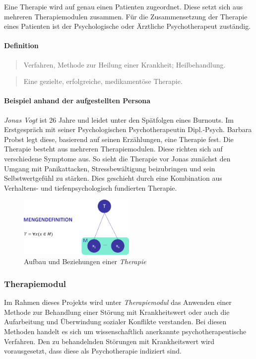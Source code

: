 Eine Therapie wird auf genau  einen Patienten zugeordnet. Diese setzt sich aus mehreren Therapiemodulen zusammen. Für die Zusammensetzung der Therapie eines Patienten ist der Psychologische oder Ärztliche Psychotherapeut zuständig.

\paragraph{Definition}
\begin{quote}
Verfahren, Methode zur Heilung einer Krankheit; Heilbehandlung. \cite{PsychThG4:online}
\end{quote}

\begin{quote}
	Eine gezielte, erfolgreiche, medikamentöse Therapie. \cite{44:online}
\end{quote}

\paragraph{Beispiel anhand der aufgestellten Persona}
\emph{Jonas Vogt} ist 26 Jahre und leidet unter den Spätfolgen eines Burnouts. Im Erstgespräch mit seiner Psychologischen Psychotherapeutin Dipl.-Psych. Barbara Probst legt diese, basierend auf seinen Erzählungen, eine Therapie fest. Die Therapie besteht aus  mehreren Therapiemodulen. Diese richten sich auf verschiedene Symptome aus. So sieht die Therapie vor Jonas zunächst den Umgang mit Panikattacken, Stressbewältigung beizubringen und sein Selbstwertgefühl zu stärken. Dies geschieht durch eine Kombination aus Verhaltens- und tiefenpsychologisch fundierten Therapie.

\begin{figure}[h]
\centering
\includegraphics[width=0.5\textwidth]{pictures/therapiedef}
\caption{Aufbau und Beziehungen einer \emph{Therapie}}
\label{therapiedef}
\end{figure}


\subsubsection{Therapiemodul}
Im Rahmen dieses Projekts wird unter \emph{Therapiemodul} das Anwenden  einer Methode zur Behandlung einer Störung mit Krankheitswert oder auch die Aufarbeitung und Überwindung sozialer Konflikte verstanden. Bei diesen Methoden handelt es sich um wissenschaftlich anerkannte psychotherapeutische Verfahren. Den zu behandelnden Störungen mit Krankheitswert wird vorausgesetzt, dass diese als Psychotherapie indiziert sind.

